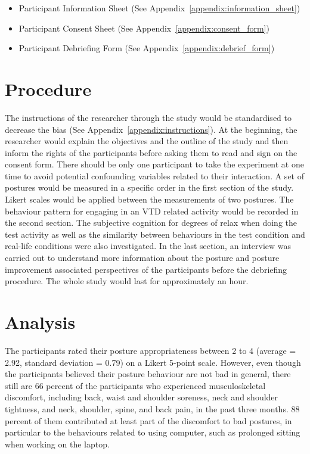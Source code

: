 \begin{itemize}
\item Participant Information Sheet (See Appendix~\ref{appendix:information_sheet})
\item Participant Consent Sheet (See Appendix~\ref{appendix:consent_form})
\item Participant Debriefing Form (See Appendix~\ref{appendix:debrief_form})
\end{itemize}

\section{Procedure}
The instructions of the researcher through the study would be standardised to decrease the bias (See Appendix~\ref{appendix:instructions}). At the beginning, the researcher would explain the objectives and the outline of the study and then inform the rights of the participants before asking them to read and sign on the consent form. There should be only one participant to take the experiment at one time to avoid potential confounding variables related to their interaction. A set of postures would be measured in a specific order in the first section of the study. Likert scales would be applied between the measurements of two postures. The behaviour pattern for engaging in an VTD related activity would be recorded in the second section. The subjective cognition for degrees of relax when doing the test activity as well as the similarity between behaviours in the test condition and real-life conditions were also investigated. In the last section, an interview was carried out to understand more information about the posture and posture improvement associated perspectives of the participants before the debriefing procedure. The whole study would last for approximately an hour.

\section{Analysis}
The participants rated their posture appropriateness between 2 to 4 (average = 2.92, standard deviation = 0.79) on a Likert 5-point scale. However, even though the participants believed their posture behaviour are not bad in general, there still are 66 percent of the participants who experienced musculoskeletal discomfort, including back, waist and shoulder soreness, neck and shoulder tightness, and neck, shoulder, spine, and back pain, in the past three months. 88 percent of them contributed at least part of the discomfort to bad postures, in particular to the behaviours related to using computer, such as prolonged sitting when working on the laptop.

